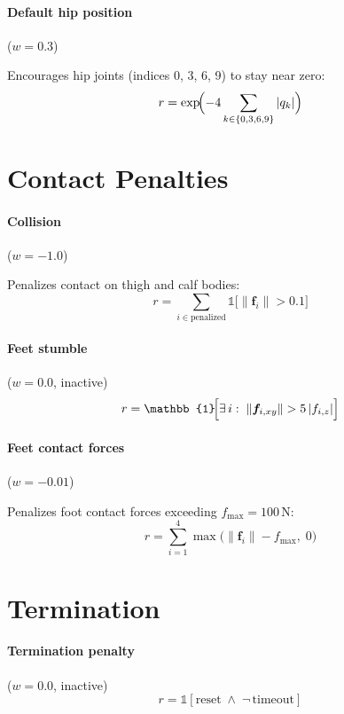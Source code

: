 \documentclass[11pt, a4paper]{article}
\begin{document}
\paragraph{Default hip position} ($w = 0.3$)

Encourages hip joints (indices 0, 3, 6, 9) to stay near zero:
\[
  r = \exp\!\Bigl(-4 \sum_{k \in \{0,3,6,9\}} |q_k|\Bigr)
\]

\section{Contact Penalties}

\paragraph{Collision} ($w = -1.0$)

Penalizes contact on thigh and calf bodies:
\[
  r = \sum_{i \in \text{penalized}} \mathbb{1}\!\bigl[\|\bm{f}_i\| > 0.1\bigr]
\]

\paragraph{Feet stumble} ($w = 0.0$, inactive)
\[
  r = \mathbb{1}\!\Bigl[\exists\, i:\; \|\bm{f}_{i,xy}\| > 5\,|f_{i,z}|\Bigr]
\]

\paragraph{Feet contact forces} ($w = -0.01$)

Penalizes foot contact forces exceeding $f_{\max} = 100\,\text{N}$:
\[
  r = \sum_{i=1}^{4} \max\!\bigl(\|\bm{f}_i\| - f_{\max},\; 0\bigr)
\]

\section{Termination}

\paragraph{Termination penalty} ($w = 0.0$, inactive)
\[
  r = \mathbb{1}[\text{reset} \;\wedge\; \neg\,\text{timeout}]
\]
\end{document}
